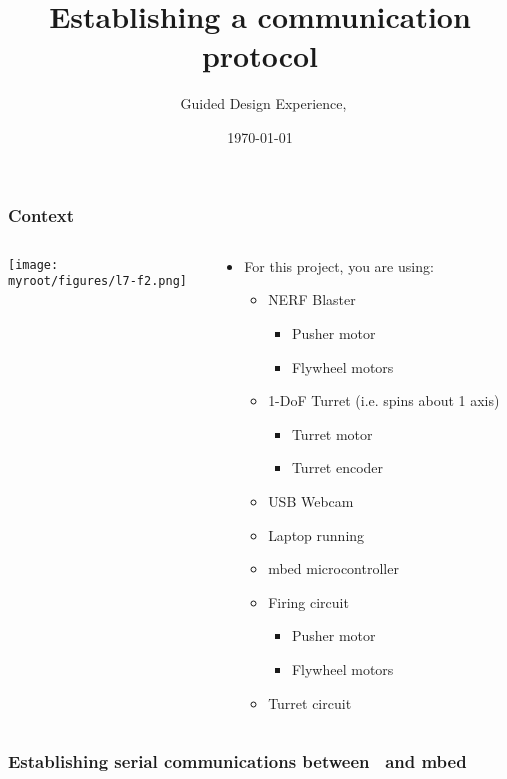 \documentclass[aspectratio=169]{beamer}
\title{Establishing a communication protocol}
\subtitle{\usnaCourseNumber\ Guided Design Experience, \usnaCourseTerm}
\author{\usnaInstructorShort}
\date{\today}
\newcommand{\myroot}{../..}
\begin{document}
\settitlebg
\begin{frame}
\titlepage
\end{frame}

\setslidebg
\begin{frame}
\frametitle{Context}
\begin{columns}
\begin{column}{0.5\textwidth}
\begin{center}
\texttt{[image: \\myroot/figures/l7-f2.png]}
\end{center}
\end{column}
\begin{column}{0.5\textwidth}
\begin{itemize}
\item For this project, you are using:
\begin{itemize}
\item NERF Blaster
\begin{itemize}
\item Pusher motor
\item Flywheel motors
\end{itemize}
\item 1-DoF Turret (i.e. spins about 1 axis)
\begin{itemize}
\item Turret motor
\item Turret encoder
\end{itemize}
\item USB Webcam
\item Laptop running \Matlab
\item mbed microcontroller
\item Firing circuit
\begin{itemize}
\item Pusher motor
\item Flywheel motors
\end{itemize}
\item Turret circuit
\end{itemize}
\end{itemize}
\end{column}
\end{columns}
\end{frame}

\begin{frame}
\frametitle{Establishing serial communications between \Matlab\ and mbed}
\begin{center}

\end{center}
\end{frame}
\end{document}
